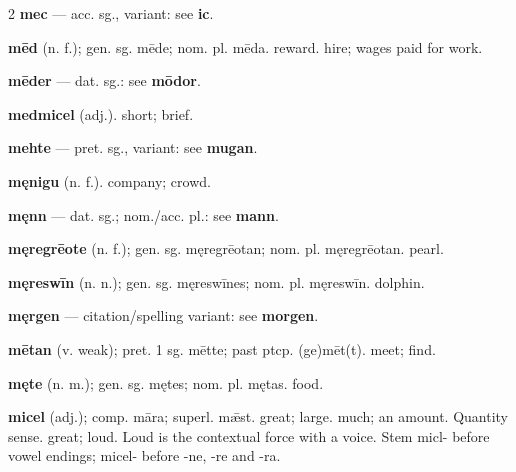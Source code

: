 \begin{multicols*}{2}
\textbf{mec} — acc. sg., variant: see \textbf{ic}.\par
\textbf{mēd} (n. f.); gen. sg. mēde; nom. pl. mēda. reward. hire; wages paid for work.\par
\textbf{mēder} — dat. sg.: see \textbf{mōdor}.\par
\textbf{medmicel} (adj.). short; brief.\par
\textbf{mehte} — pret. sg., variant: see \textbf{mugan}.\par
\textbf{męnigu} (n. f.). company; crowd.\par
\textbf{męnn} — dat. sg.; nom./acc. pl.: see \textbf{mann}.\par
\textbf{męregrēote} (n. f.); gen. sg. męregrēotan; nom. pl. męregrēotan. pearl.\par
\textbf{męreswīn} (n. n.); gen. sg. męreswīnes; nom. pl. męreswīn. dolphin.\par
\textbf{męrgen} — citation/spelling variant: see \textbf{morgen}.\par
\textbf{mētan} (v. weak); pret. 1 sg. mētte; past ptcp. (ge)mēt(t). meet; find.\par
\textbf{męte} (n. m.); gen. sg. mętes; nom. pl. mętas. food.\par
\textbf{micel} (adj.); comp. māra; superl. mǣst. great; large. much; an amount. Quantity sense. great; loud. Loud is the contextual force with a voice. Stem micl- before vowel endings; micel- before -ne, -re and -ra.\par

\end{multicols*}
